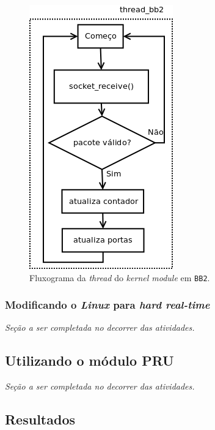\begin{figure}[h]

\centering
\includegraphics[scale=0.55]{image/thread_bb2}
\caption {Fluxograma da \textit{thread} do \textit{kernel module} em
\texttt{BB2}.}
\label{fig:thread_bb2}
\end{figure}

\FloatBarrier

\subsubsection{Modificando o \textit{Linux} para \textit{hard real-time}}
\label{kernel-linux}

\textit{Seção a ser completada no decorrer das atividades.}

\subsection{Utilizando o módulo PRU}

\textit{Seção a ser completada no decorrer das atividades.}

\subsection {Resultados}

